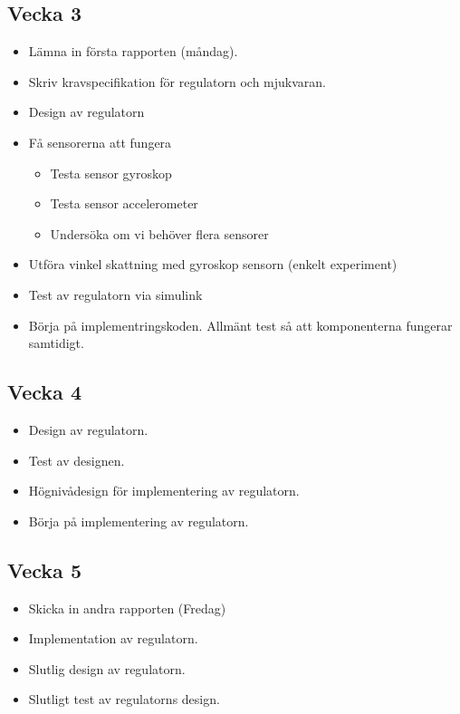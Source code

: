 \documentclass[a4paper]{article}
\begin{document}
    \subsection*{Vecka 3}
    \begin{itemize}
    \item Lämna in första rapporten (måndag).
	\item Skriv kravspecifikation för regulatorn och mjukvaran.
    \item Design av regulatorn
    \item Få sensorerna att fungera
    \begin{itemize}
    	\item Testa sensor gyroskop
	\item Testa sensor accelerometer
	\item Undersöka om vi behöver flera sensorer
    \end{itemize}
    \item Utföra vinkel skattning med gyroskop sensorn (enkelt experiment)
    \item Test av regulatorn via simulink
    \item Börja på implementringskoden. Allmänt test så att komponenterna fungerar samtidigt.
	\end{itemize}
    
    \subsection*{Vecka 4}
    \begin{itemize}
	\item Design av regulatorn.
    \item Test av designen.
    \item Högnivådesign för implementering av regulatorn.
    \item Börja på implementering av regulatorn.
	\end{itemize}
    
    \subsection*{Vecka 5}
    \begin{itemize}
    \item Skicka in andra rapporten (Fredag)
	\item Implementation av regulatorn.
    \item Slutlig design av regulatorn.
    \item Slutligt test av regulatorns design.
	\end{itemize}
    
\end{document}
